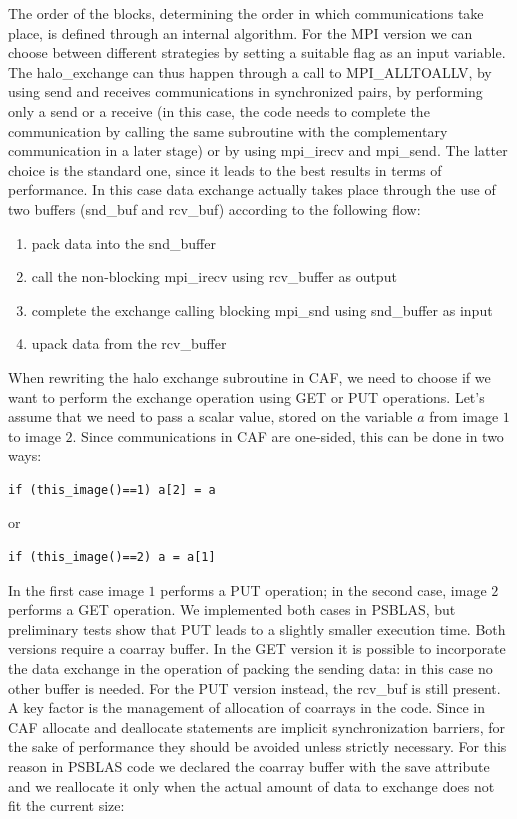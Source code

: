 \documentclass{IOS-Book-Article}
\begin{document}
The order of the blocks, determining the order in which communications take place, is defined through an internal algorithm.
For the MPI version we can choose between different strategies by setting a suitable flag as an input variable. The halo\_exchange can thus happen through a call to MPI\_ALLTOALLV, by using send and receives communications in synchronized pairs, by performing only a send or a receive (in this case, the code needs to complete the communication by calling the same subroutine with the complementary communication in a later stage) or by using mpi\_irecv and mpi\_send. 
The latter choice is the standard one, since it leads to the best results in terms of performance. In this case data exchange actually takes place through the use of two buffers (snd\_buf and rcv\_buf) according to the following flow:
\begin{enumerate}
\item pack data into the snd\_buffer
\item call the non-blocking mpi\_irecv using rcv\_buffer as output
\item complete the exchange calling blocking mpi\_snd using snd\_buffer as input
\item upack data from the rcv\_buffer
\end{enumerate} 

When rewriting the halo exchange subroutine in CAF, we need to choose if we want to perform the exchange operation using GET or PUT operations. 
Let's assume that we need to pass a scalar value, stored on the variable $a$ from image $1$ to image $2$. Since communications in CAF are one-sided, this can be done in two ways:

\lstset{language=Fortran} 

\begin{lstlisting}
if (this_image()==1) a[2] = a
\end{lstlisting}
or
\begin{lstlisting}
if (this_image()==2) a = a[1]
\end{lstlisting}

In the first case image $1$ performs a PUT operation; in the second case, image $2$ performs a GET operation. We implemented both cases in PSBLAS, but preliminary tests  show that PUT leads to a slightly smaller execution time.
Both versions require a coarray buffer. In the GET version it is possible to incorporate the data exchange in the operation of packing the sending data: in this case no other buffer is needed. For the PUT version instead, the rcv\_buf is still present.
A key factor is the management of  allocation of coarrays in the code. Since in CAF allocate and deallocate statements are implicit synchronization barriers, for the sake of performance they should be avoided unless strictly necessary.
For this reason in PSBLAS code we declared the coarray buffer with the save attribute and we reallocate it only when the actual amount of data to exchange does not fit the current size:
\end{document}

